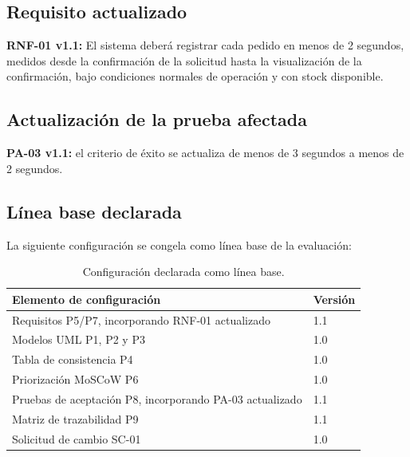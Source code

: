 \documentclass[12pt,a4paper]{article}
\begin{document}
\subsection*{Requisito actualizado}
\textbf{RNF-01 v1.1:} El sistema deberá registrar cada pedido en menos de 2 segundos, medidos desde la confirmación de la solicitud hasta la visualización de la confirmación, bajo condiciones normales de operación y con stock disponible.

\subsection*{Actualización de la prueba afectada}
\textbf{PA-03 v1.1:} el criterio de éxito se actualiza de menos de 3 segundos a menos de 2 segundos.

\subsection*{Línea base declarada}
La siguiente configuración se congela como línea base de la evaluación:

\begin{table}[H]
\centering
\begin{tabularx}{\textwidth}{|X|p{3cm}|}\hline
\textbf{Elemento de configuración} & \textbf{Versión} \\
\hline
Requisitos P5/P7, incorporando RNF-01 actualizado & 1.1 \\
\hline
Modelos UML P1, P2 y P3 & 1.0 \\
\hline
Tabla de consistencia P4 & 1.0 \\
\hline
Priorización MoSCoW P6 & 1.0 \\
\hline
Pruebas de aceptación P8, incorporando PA-03 actualizado & 1.1 \\
\hline
Matriz de trazabilidad P9 & 1.1 \\
\hline
Solicitud de cambio SC-01 & 1.0 \\
\hline
\end{tabularx}
\caption{Configuración declarada como línea base.}
\end{table}
\end{document}
